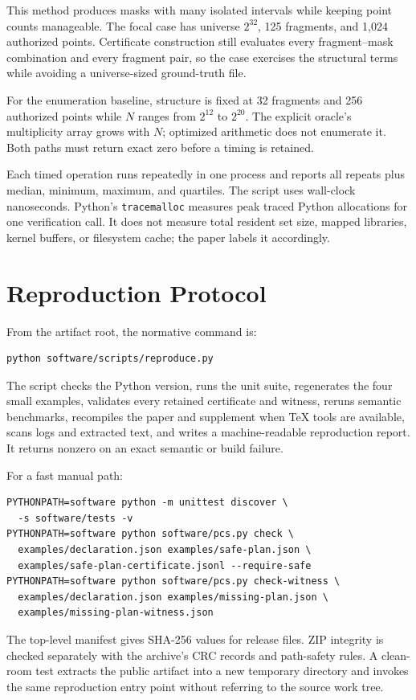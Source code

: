 \documentclass[11pt,onecolumn]{IEEEtran}
\newcommand{\code}[1]{\texttt{#1}}
\begin{document}
This method produces masks with many isolated intervals while keeping point counts manageable.  The focal case has universe $2^{32}$, 125 fragments, and 1,024 authorized points.  Certificate construction still evaluates every fragment--mask combination and every fragment pair, so the case exercises the structural terms while avoiding a universe-sized ground-truth file.

For the enumeration baseline, structure is fixed at 32 fragments and 256 authorized points while $N$ ranges from $2^{12}$ to $2^{20}$.  The explicit oracle's multiplicity array grows with $N$; optimized arithmetic does not enumerate it.  Both paths must return exact zero before a timing is retained.

Each timed operation runs repeatedly in one process and reports all repeats plus median, minimum, maximum, and quartiles.  The script uses wall-clock nanoseconds.  Python's \code{tracemalloc} measures peak traced Python allocations for one verification call.  It does not measure total resident set size, mapped libraries, kernel buffers, or filesystem cache; the paper labels it accordingly.

\section{Reproduction Protocol}
From the artifact root, the normative command is:
\begin{verbatim}
python software/scripts/reproduce.py
\end{verbatim}
The script checks the Python version, runs the unit suite, regenerates the four small examples, validates every retained certificate and witness, reruns semantic benchmarks, recompiles the paper and supplement when TeX tools are available, scans logs and extracted text, and writes a machine-readable reproduction report.  It returns nonzero on an exact semantic or build failure.

For a fast manual path:
\begin{verbatim}
PYTHONPATH=software python -m unittest discover \
  -s software/tests -v
PYTHONPATH=software python software/pcs.py check \
  examples/declaration.json examples/safe-plan.json \
  examples/safe-plan-certificate.jsonl --require-safe
PYTHONPATH=software python software/pcs.py check-witness \
  examples/declaration.json examples/missing-plan.json \
  examples/missing-plan-witness.json
\end{verbatim}
The top-level manifest gives SHA-256 values for release files.  ZIP integrity is checked separately with the archive's CRC records and path-safety rules.  A clean-room test extracts the public artifact into a new temporary directory and invokes the same reproduction entry point without referring to the source work tree.
\end{document}
